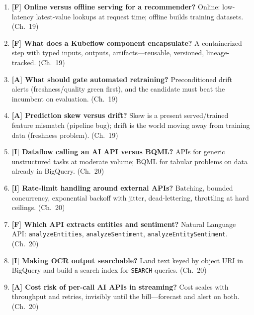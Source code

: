 \begin{enumerate}
    \item \textbf{[F] Online versus offline serving for a recommender?} Online: low-latency
    latest-value lookups at request time; offline builds training datasets. (Ch.~19)
    \item \textbf{[F] What does a Kubeflow component encapsulate?} A containerized step with typed
    inputs, outputs, artifacts---reusable, versioned, lineage-tracked. (Ch.~19)
    \item \textbf{[A] What should gate automated retraining?} Preconditioned drift alerts
    (freshness/quality green first), and the candidate must beat the incumbent on evaluation.
    (Ch.~19)
    \item \textbf{[A] Prediction skew versus drift?} Skew is a present served/trained feature
    mismatch (pipeline bug); drift is the world moving away from training data (freshness
    problem). (Ch.~19)
    \item \textbf{[I] Dataflow calling an AI API versus BQML?} APIs for generic unstructured tasks
    at moderate volume; BQML for tabular problems on data already in BigQuery. (Ch.~20)
    \item \textbf{[I] Rate-limit handling around external APIs?} Batching, bounded concurrency,
    exponential backoff with jitter, dead-lettering, throttling at hard ceilings. (Ch.~20)
    \item \textbf{[F] Which API extracts entities and sentiment?} Natural Language API:
    \texttt{analyzeEntities}, \texttt{analyzeSentiment}, \texttt{analyzeEntitySentiment}. (Ch.~20)
    \item \textbf{[I] Making OCR output searchable?} Land text keyed by object URI in BigQuery and
    build a search index for \texttt{SEARCH} queries. (Ch.~20)
    \item \textbf{[A] Cost risk of per-call AI APIs in streaming?} Cost scales with throughput and
    retries, invisibly until the bill---forecast and alert on both. (Ch.~20)
\end{enumerate}

